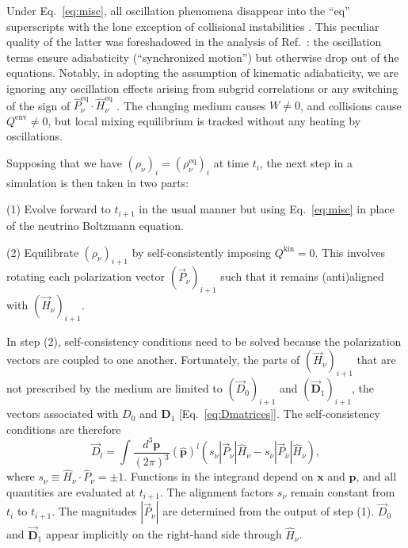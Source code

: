 \documentclass[aps,prd,twocolumn,groupedaddress,preprintnumbers]{revtex4-2}
\begin{document}
Under Eq.~\eqref{eq:misc}, all oscillation phenomena disappear into the ``eq'' superscripts with the lone exception of collisional instabilities \cite{johns2023, johns2022, johns2022b, padillagay2022b, lin2023, xiong2023, xiong2022b, liu2023, johns2023d, kato2024collisional}. This peculiar quality of the latter was foreshadowed in the analysis of Ref.~\cite{johns2023}: the oscillation terms ensure adiabaticity (``synchronized motion'') but otherwise drop out of the equations. Notably, in adopting the assumption of kinematic adiabaticity, we are ignoring any oscillation effects arising from subgrid correlations or any switching of the sign of $\hat{P}^{\textrm{eq}}_\nu \cdot \hat{H}^{\textrm{eq}}_\nu$ \cite{johns2024}. The changing medium causes $W \neq 0$, and collisions cause $Q^\textrm{env} \neq 0$, but local mixing equilibrium is tracked without any heating by oscillations.

Supposing that we have $( \rho_\nu )_i = ( \rho_\nu^\textrm{eq} )_i$ at time $t_i$, the next step in a simulation is then taken in two parts:

(1) Evolve forward to $t_{i+1}$ in the usual manner but using Eq.~\eqref{eq:misc} in place of the neutrino Boltzmann equation.

(2) Equilibrate $( \rho_\nu )_{i+1}$ by self-consistently imposing $Q^\textrm{kin} = 0$. This involves rotating each polarization vector $( \vec{P}_\nu )_{i+1}$ such that it remains (anti)aligned with $( \vec{H}_\nu )_{i+1}$.

In step (2), self-consistency conditions need to be solved because the polarization vectors are coupled to one another. Fortunately, the parts of $( \vec{H}_\nu )_{i+1}$ that are not prescribed by the medium are limited to $( \vec{D}_0 )_{i+1}$ and $( \vec{\boldsymbol{D}}_1 )_{i+1}$, the vectors associated with $D_0$ and $\boldsymbol{D}_1$ [Eq.~\eqref{eq:Dmatrices}]. The self-consistency conditions are therefore
\begin{equation}
\vec{D}_l = \int \frac{d^3 \boldsymbol{p}}{(2\pi)^3} \left( \boldsymbol{\hat{p}} \right)^l \left( s_\nu | \vec{P}_\nu | \hat{H}_\nu - s_{\bar{\nu}} | \vec{P}_{\bar{\nu}} | \hat{H}_{\bar{\nu}} \right), \label{eq:selfcons}
\end{equation}
where $s_\nu \equiv \hat{H}_\nu \cdot \hat{P}_\nu = \pm 1$. Functions in the integrand depend on $\boldsymbol{x}$ and $\boldsymbol{p}$, and all quantities are evaluated at $t_{i+1}$. The alignment factors $s_\nu$ remain constant from $t_i$ to $t_{i+1}$. The magnitudes $| \vec{P}_\nu |$ are determined from the output of step (1). $\vec{D}_0$ and $\vec{\boldsymbol{D}}_1$ appear implicitly on the right-hand side through $\hat{H}_\nu$.
\end{document}
